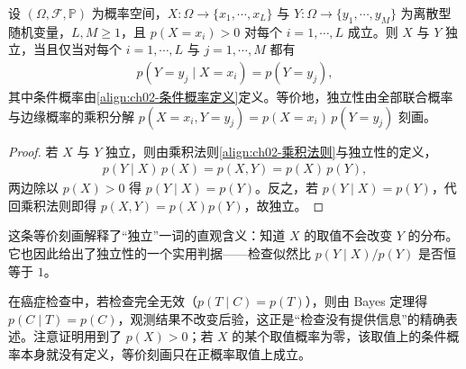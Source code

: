\documentclass[../../main.tex]{subfiles}
\begin{document}
\begin{proposition}[独立性的条件概率刻画]\label{proposition:ch02-独立性刻画}
设 $(\Omega,\mathcal{F},\mathbb{P})$ 为概率空间，$X:\Omega\to\{x_1,\cdots,x_L\}$ 与 $Y:\Omega\to\{y_1,\cdots,y_M\}$ 为离散型随机变量，$L,M\geqslant1$，且 $p(X=x_i)>0$ 对每个 $i=1,\cdots,L$ 成立。则 $X$ 与 $Y$ 独立，当且仅当对每个 $i=1,\cdots,L$ 与 $j=1,\cdots,M$ 都有
\begin{align*}
  p(Y=y_j\mid X=x_i)=p(Y=y_j),
\end{align*}
其中条件概率由\eqref{align:ch02-条件概率定义}定义。等价地，独立性由全部联合概率与边缘概率的乘积分解 $p(X=x_i,Y=y_j)=p(X=x_i)\,p(Y=y_j)$ 刻画。
\end{proposition}

\begin{proof}
若 $X$ 与 $Y$ 独立，则由乘积法则\eqref{align:ch02-乘积法则}与独立性的定义，
\begin{align*}
 p(Y\mid X)\,p(X) = p(X,Y) = p(X)\,p(Y) ,
\end{align*}
两边除以 $p(X)>0$ 得 $p(Y\mid X)=p(Y)$。反之，若 $p(Y\mid X)=p(Y)$，代回乘积法则即得 $p(X,Y)=p(X)p(Y)$，故独立。
\end{proof}

\begin{remark}
这条等价刻画解释了“独立”一词的直观含义：知道 $X$ 的取值不会改变 $Y$ 的分布。它也因此给出了独立性的一个实用判据——检查似然比 $p(Y\mid X)/p(Y)$ 是否恒等于 $1$。

在癌症检查中，若检查完全无效（$p(T\mid C)=p(T)$），则由 Bayes 定理得 $p(C\mid T)=p(C)$，观测结果不改变后验，这正是“检查没有提供信息”的精确表述。注意证明用到了 $p(X)>0$；若 $X$ 的某个取值概率为零，该取值上的条件概率本身就没有定义，等价刻画只在正概率取值上成立。
\end{remark}
\end{document}
